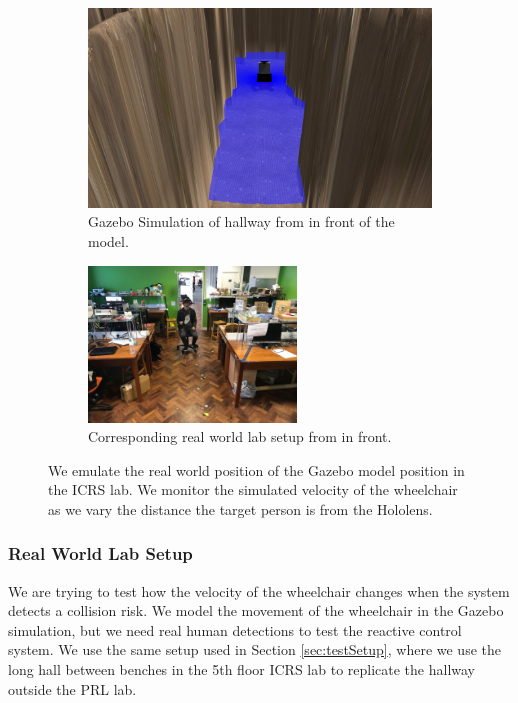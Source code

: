 \begin{figure}[ht!]
	\begin{subfigure}[b]{.48\textwidth}
		\centering
		\includegraphics[width=1.0\linewidth]{img/chapter6_test/gazeboFront.jpg}
		\caption{Gazebo Simulation of hallway from in front of the model.}
	\end{subfigure}%
	\hspace{\fill} 
	\begin{subfigure}[b]{.48\textwidth}
		\centering
		\includegraphics[width=1.0\linewidth,height=41.5mm]{img/chapter6_test/realFront.jpg}
		\caption{Corresponding real world lab setup from in front.}
	\end{subfigure}
	\vspace{-1\baselineskip}
	\begin{center}
		\caption{We emulate the real world position of the Gazebo model position in the ICRS lab. We monitor the simulated velocity of the wheelchair as we vary the distance the target person is from the Hololens.}
		\label{fig:greenredrender}
	\end{center}
	\vspace{-2\baselineskip}
\end{figure}

\subsubsection{Real World Lab Setup}
We are trying to test how the velocity of the wheelchair changes when the system detects a collision risk. We model the movement of the wheelchair in the Gazebo simulation, but we need real human detections to test the reactive control system. We use the same setup used in Section \ref{sec:testSetup}, where we use the long hall between benches in the 5th floor ICRS lab to replicate the hallway outside the PRL lab.

